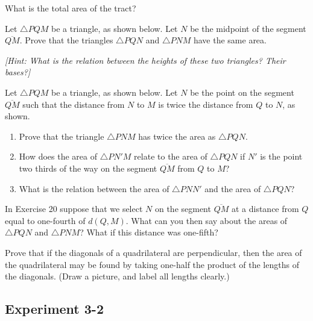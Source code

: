 \documentclass[12pt]{book} %
\begin{document}
\begin{ExerciseList}
What is the total area of the tract?

\Exercise Let $\triangle PQM$ be a triangle, as shown below. Let $N$ be the midpoint of the segment $\overline{QM}$. Prove that the triangles $\triangle PQN$ and $\triangle PNM$ have the same area.


\textit{[Hint: What is the relation between the heights of these two triangles? Their bases?]}

\Exercise Let $\triangle PQM$ be a triangle, as shown below. Let $N$ be the point on the segment $\overline{QM}$ such that the distance from $N$ to $M$ is twice the distance from $Q$ to $N$, as shown.


\begin{enumerate}
\item[(a)] Prove that the triangle $\triangle PNM$ has twice the area as $\triangle PQN$.
\item[(b)] How does the area of $\triangle PN'M$ relate to the area of $\triangle PQN$ if $N'$ is the point two thirds of the way on the segment $\overline{QM}$ from $Q$ to $M$?
\item[(c)] What is the relation between the area of $\triangle PNN'$ and the area of $\triangle PQN$?
\end{enumerate}

\Exercise In Exercise 20 suppose that we select $N$ on the segment $\overline{QM}$ at a distance from $Q$ equal to one-fourth of $d(Q,M)$. What can you then say about the areas of $\triangle PQN$ and $\triangle PNM$? What if this distance was one-fifth?

\Exercise Prove that if the diagonals of a quadrilateral are perpendicular, then the area of the quadrilateral may be found by taking one-half the product of the lengths of the diagonals. (Draw a picture, and label all lengths clearly.)
\end{ExerciseList}

\subsection*{Experiment 3-2}
\end{document}
